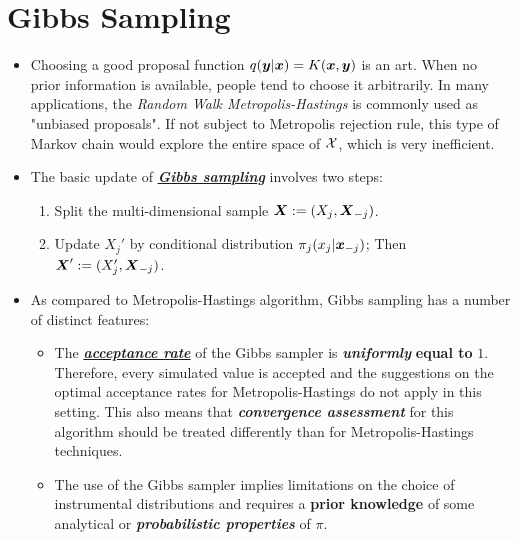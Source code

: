 \documentclass[11pt]{article}
\begin{document}
\section{Gibbs Sampling}
\begin{itemize}
\item Choosing a good proposal function $q(\boldsymbol{y}|\boldsymbol{x}) = K(\boldsymbol{x}, \boldsymbol{y})$ is an art. When no prior information is available, people tend to choose it arbitrarily. In many applications, the \emph{Random Walk Metropolis-Hastings} is commonly used as "unbiased proposals". If not subject to Metropolis rejection rule, this type of Markov chain would explore the entire space of ${\mathcal X}$, which is very inefficient.


\item The basic update of \underline{\emph{\textbf{Gibbs sampling}}} involves two steps:
\begin{enumerate}
\item Split the multi-dimensional sample $\boldsymbol{X} := (X_j, \boldsymbol{X}_{-j})$. 
\item Update $X_j'$ by conditional distribution $\pi_{j}(x_j | \boldsymbol{x}_{-j})$; Then $\boldsymbol{X}' := (X_j', \boldsymbol{X}_{-j})$.
\end{enumerate}

\item As compared to Metropolis-Hastings algorithm, Gibbs sampling has a number of distinct features:
\begin{itemize}
\item The \underline{\emph{\textbf{acceptance rate}}} of the Gibbs sampler is \emph{\textbf{uniformly}} \textbf{equal to} $1$. Therefore, every simulated value is accepted and the suggestions on the optimal acceptance rates for Metropolis-Hastings do not apply in this setting. This also means that \emph{\textbf{convergence assessment}} for this algorithm should be treated differently than for Metropolis-Hastings techniques.

\item The use of the Gibbs sampler implies limitations on the choice of instrumental distributions and requires a \textbf{prior knowledge} of some analytical or \emph{\textbf{probabilistic properties}} of $\pi$.


\end{itemize}
\end{itemize}
\end{document}
